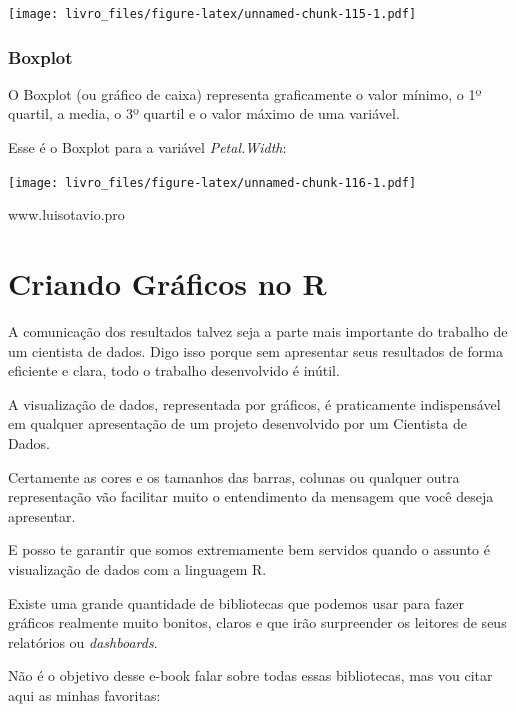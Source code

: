 \documentclass[
]{book}
\newenvironment{Shaded}{\begin{snugshade}}{\end{snugshade}}
\newcommand{\KeywordTok}[1]{\textcolor[rgb]{0.13,0.29,0.53}{\textbf{#1}}}
\newcommand{\NormalTok}[1]{#1}
\newcommand{\OperatorTok}[1]{\textcolor[rgb]{0.81,0.36,0.00}{\textbf{#1}}}
\begin{document}
\texttt{[image: livro\_files/figure-latex/unnamed-chunk-115-1.pdf]}

\hypertarget{boxplot}{%
\subsection{Boxplot}\label{boxplot}}

O Boxplot (ou gráfico de caixa) representa graficamente o valor mínimo,
o 1º quartil, a media, o 3º quartil e o valor máximo de uma variável.

Esse é o Boxplot para a variável \emph{Petal.Width}:

\begin{Shaded}
\end{Shaded}

\texttt{[image: livro\_files/figure-latex/unnamed-chunk-116-1.pdf]}

www.luisotavio.pro

\hypertarget{criando-gruxe1ficos-no-r}{%
\chapter{Criando Gráficos no R}\label{criando-gruxe1ficos-no-r}}

A comunicação dos resultados talvez seja a parte mais importante do
trabalho de um cientista de dados. Digo isso porque sem apresentar seus
resultados de forma eficiente e clara, todo o trabalho desenvolvido é
inútil.

A visualização de dados, representada por gráficos, é praticamente
indispensável em qualquer apresentação de um projeto desenvolvido por um
Cientista de Dados.

Certamente as cores e os tamanhos das barras, colunas ou qualquer outra
representação vão facilitar muito o entendimento da mensagem que você
deseja apresentar.

E posso te garantir que somos extremamente bem servidos quando o assunto
é visualização de dados com a linguagem R.

Existe uma grande quantidade de bibliotecas que podemos usar para fazer
gráficos realmente muito bonitos, claros e que irão surpreender os
leitores de seus relatórios ou \emph{dashboards}.

Não é o objetivo desse e-book falar sobre todas essas bibliotecas, mas
vou citar aqui as minhas favoritas:
\end{document}
